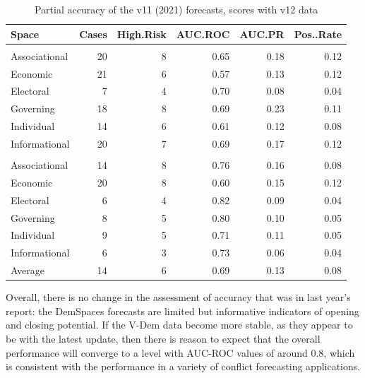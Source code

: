 \documentclass[
  11pt,
]{article}
\begin{document}
\begin{table}

\caption{\label{tab:v11-accuracy}Partial accuracy of the v11 (2021) forecasts, scores with v12 data}
\centering
\begin{tabular}[t]{lrrrrr}
\toprule
Space & Cases & High.Risk & AUC.ROC & AUC.PR & Pos..Rate\\
\midrule
\addlinespace[0.3em]
\multicolumn{6}{l}{\textbf{Closing}}\\
\hspace{1em}Associational & 20 & 8 & 0.65 & 0.18 & 0.12\\
\hspace{1em}Economic & 21 & 6 & 0.57 & 0.13 & 0.12\\
\hspace{1em}Electoral & 7 & 4 & 0.70 & 0.08 & 0.04\\
\hspace{1em}Governing & 18 & 8 & 0.69 & 0.23 & 0.11\\
\hspace{1em}Individual & 14 & 6 & 0.61 & 0.12 & 0.08\\
\hspace{1em}Informational & 20 & 7 & 0.69 & 0.17 & 0.12\\
\addlinespace[0.3em]
\multicolumn{6}{l}{\textbf{Opening}}\\
\hspace{1em}Associational & 14 & 8 & 0.76 & 0.16 & 0.08\\
\hspace{1em}Economic & 20 & 8 & 0.60 & 0.15 & 0.12\\
\hspace{1em}Electoral & 6 & 4 & 0.82 & 0.09 & 0.04\\
\hspace{1em}Governing & 8 & 5 & 0.80 & 0.10 & 0.05\\
\hspace{1em}Individual & 9 & 5 & 0.71 & 0.11 & 0.05\\
\hspace{1em}Informational & 6 & 3 & 0.73 & 0.06 & 0.04\\
Average & 14 & 6 & 0.69 & 0.13 & 0.08\\
\bottomrule
\end{tabular}
\end{table}

Overall, there is no change in the assessment of accuracy that was in
last year's report: the DemSpaces forecasts are limited but informative
indicators of opening and closing potential. If the V-Dem data become
more stable, as they appear to be with the latest update, then there is
reason to expect that the overall performance will converge to a level
with AUC-ROC values of around 0.8, which is consistent with the
performance in a variety of conflict forecasting applications.
\end{document}
